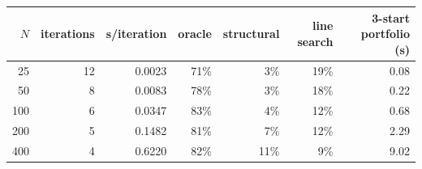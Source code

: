 \begin{tabular}{rrrrrrr}
\toprule
$N$ & iterations & s/iteration & oracle & structural & line search & 3-start portfolio (s)\\
\midrule
25 & 12 & 0.0023 & 71\% & 3\% & 19\% & 0.08\\
50 & 8 & 0.0083 & 78\% & 3\% & 18\% & 0.22\\
100 & 6 & 0.0347 & 83\% & 4\% & 12\% & 0.68\\
200 & 5 & 0.1482 & 81\% & 7\% & 12\% & 2.29\\
400 & 4 & 0.6220 & 82\% & 11\% & 9\% & 9.02\\
\bottomrule
\end{tabular}
